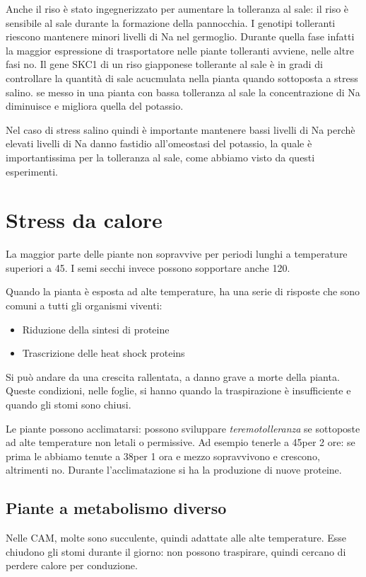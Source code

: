 \documentclass[a4paper,12pt]{book}
\begin{document}
Anche il riso è stato ingegnerizzato per aumentare la tolleranza al sale: il riso è sensibile al sale durante la formazione della pannocchia. I genotipi tolleranti riescono  mantenere minori livelli di Na nel germoglio. 
Durante quella fase infatti la maggior espressione di trasportatore nelle piante tolleranti avviene, nelle altre fasi no.
Il gene SKC1 di un riso giapponese tollerante al sale è in gradi di controllare la quantità di sale acucmulata nella pianta quando sottoposta a stress salino. se messo in una pianta con bassa tolleranza al sale la concentrazione di Na diminuisce e migliora quella del potassio.

Nel caso di stress salino quindi è importante mantenere bassi livelli di Na perchè elevati livelli di Na danno fastidio all'omeostasi del potassio, la quale è importantissima per la tolleranza al sale, come abbiamo visto da questi esperimenti.

\section{Stress da calore}
La maggior parte delle piante non sopravvive per periodi lunghi a temperature superiori a 45\textcelsius.   I semi secchi invece possono sopportare anche 120\textcelsius.

Quando la pianta è esposta ad alte temperature, ha una serie di risposte che sono comuni a tutti gli organismi viventi:
\begin{itemize}
\item{Riduzione della sintesi di proteine}
\item{Trascrizione delle heat shock proteins}
\end{itemize}

Si può andare da una crescita rallentata, a danno grave a morte della pianta. Queste condizioni, nelle foglie, si hanno quando la traspirazione è insufficiente e quando gli stomi sono chiusi.

Le piante possono acclimatarsi: possono sviluppare \emph{teremotolleranza} se sottoposte ad alte temperature non letali o permissive. Ad esempio tenerle a 45\textcelsius  per 2 ore: se prima le abbiamo tenute a 38\textcelsius per 1 ora e mezzo sopravvivono e crescono, altrimenti no.
Durante l'acclimatazione si ha la produzione di nuove proteine.

\subsection{Piante a metabolismo diverso}
Nelle CAM, molte sono succulente, quindi adattate alle alte temperature. Esse chiudono gli stomi durante il giorno: non possono traspirare, quindi cercano di perdere calore per conduzione.
\end{document}
